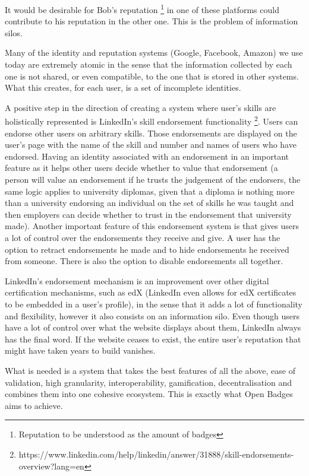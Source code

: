 \documentclass[llncsdoc]{llncs}
\begin{document}
It would be desirable for Bob's reputation \footnote{Reputation to be understood as the amount of badges} in one of these platforms could contribute to his reputation in the other one. This is the problem of information silos. 

Many of the identity and reputation systems (Google, Facebook, Amazon) we use today are extremely atomic in the sense that the information collected by each one is not shared, or even compatible, to the one that is stored in other systems. What this creates, for each user, is a set of incomplete identities. 

A positive step in the direction of creating a system where user's skills are holistically represented is LinkedIn's skill endorsement functionality \footnote{https://www.linkedin.com/help/linkedin/answer/31888/skill-endorsements-overview?lang=en}. Users can endorse other users on arbitrary skills. Those endorsements are displayed on the user's page with the name of the skill and number and names of users who have endorsed. Having an identity associated with an endorsement in an important feature as it helps other users decide whether to value that endorsement (a person will value an endorsement if he trusts the judgement of the endorsers, the same logic applies to university diplomas, given that a diploma is nothing more than a university endorsing an individual on the set of skills he was taught and then employers can decide whether to trust in the endorsement that university made). Another important feature of this endorsement system is that gives users a lot of control over the endorsements they receive and give. A user has the option to retract endorsements he made and to hide endorsements he received from someone. There is also the option to disable endorsements all together.

LinkedIn's endorsement mechanism is an improvement over other digital certification mechanisms, such as edX (LinkedIn even allows for edX certificates to be embedded in a user's profile), in the sense that it adds a lot of functionality and flexibility, however it also consists on an information silo. Even though users have a lot of control over what the website displays about them, LinkedIn always has the final word. If the website ceases to exist, the entire user's reputation that might have taken years to build vanishes.

What is needed is a system that takes the best features of all the above, ease of validation, high granularity, interoperability, gamification, decentralisation and combines them into one cohesive ecosystem. This is exactly what Open Badges aims to achieve.
\end{document}

